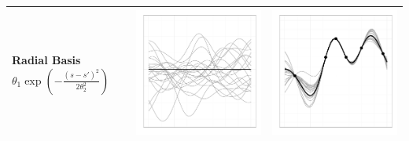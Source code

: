 \documentclass[a4paper,natbib]{apa6}
\begin{document}
\begin{table}[h!]
\begin{tabular}{lcc}
\parbox[b]{5cm}{Radial Basis\\ $\theta_1\exp\left(-\frac{(s-s')^2}{2\theta_2^2}\right)$\\\\}& 
\includegraphics[scale=0.2]{figure7.pdf} & 
\includegraphics[scale=0.2]{figure8.pdf} \\ \hline
\end{tabular}
\end{table}
\end{document}
